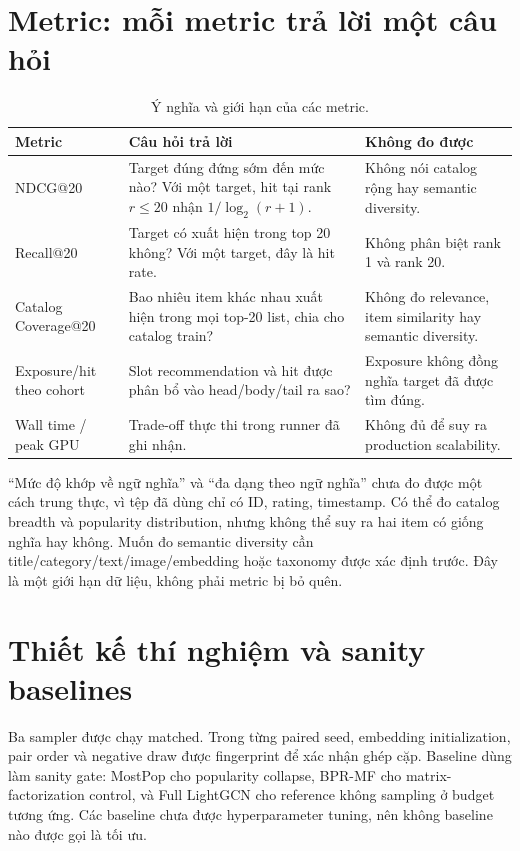 \documentclass[12pt,a4paper]{article}
\begin{document}
\section{Metric: mỗi metric trả lời một câu hỏi}
\begin{table}[h]
\centering
\caption{Ý nghĩa và giới hạn của các metric.}\label{tab:metrics}
\begin{tabularx}{\linewidth}{l Y Y}
\toprule
Metric & Câu hỏi trả lời & Không đo được \\
\midrule
NDCG@20 & Target đúng đứng sớm đến mức nào? Với một target, hit tại rank $r\le20$ nhận $1/\log_2(r+1)$. & Không nói catalog rộng hay semantic diversity. \\
Recall@20 & Target có xuất hiện trong top 20 không? Với một target, đây là hit rate. & Không phân biệt rank 1 và rank 20. \\
Catalog Coverage@20 & Bao nhiêu item khác nhau xuất hiện trong mọi top-20 list, chia cho catalog train? & Không đo relevance, item similarity hay semantic diversity. \\
Exposure/hit theo cohort & Slot recommendation và hit được phân bổ vào head/body/tail ra sao? & Exposure không đồng nghĩa target đã được tìm đúng. \\
Wall time / peak GPU & Trade-off thực thi trong runner đã ghi nhận. & Không đủ để suy ra production scalability. \\
\bottomrule
\end{tabularx}
\end{table}

``Mức độ khớp về ngữ nghĩa'' và ``đa dạng theo ngữ nghĩa'' chưa đo được một cách trung thực, vì tệp đã dùng chỉ có ID, rating, timestamp. Có thể đo catalog breadth và popularity distribution, nhưng không thể suy ra hai item có giống nghĩa hay không. Muốn đo semantic diversity cần title/category/text/image/embedding hoặc taxonomy được xác định trước. Đây là một giới hạn dữ liệu, không phải metric bị bỏ quên.

\section{Thiết kế thí nghiệm và sanity baselines}
Ba sampler được chạy matched. Trong từng paired seed, embedding initialization, pair order và negative draw được fingerprint để xác nhận ghép cặp. Baseline dùng làm sanity gate: MostPop cho popularity collapse, BPR-MF cho matrix-factorization control, và Full LightGCN cho reference không sampling ở budget tương ứng. Các baseline chưa được hyperparameter tuning, nên không baseline nào được gọi là tối ưu.
\end{document}
